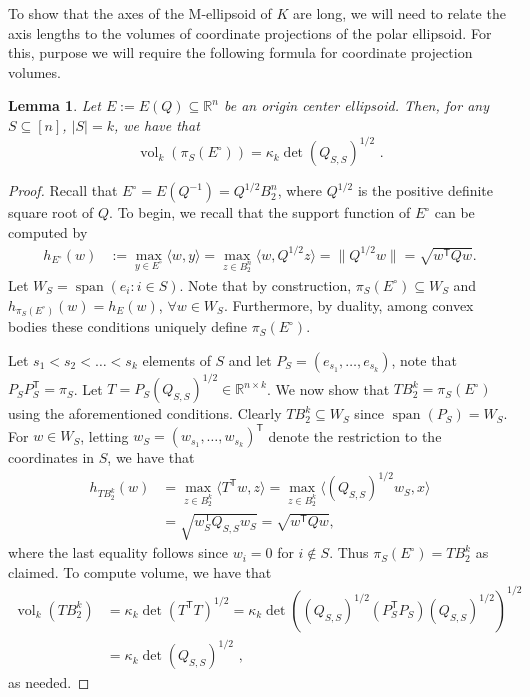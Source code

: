 \documentclass[12pt]{article}
\newtheorem{lemma}{Lemma}
\newcommand{\R}{{\mathbb{R}}}
\newcommand{\T}{\mathsf T}
\newcommand{\inner}[2]{\langle #1, #2 \rangle}
\DeclareMathOperator{\vol}{vol}
\DeclareMathOperator{\lspan}{span}
\begin{document}
To show that the axes of the M-ellipsoid of $K$ are long, we will need to relate
the axis lengths to the volumes of coordinate projections of the polar
ellipsoid. For this, purpose we will require the following formula for
coordinate projection volumes. 

\begin{lemma}\label{lem:ellipsoid-volumes}
Let $E := E(Q) \subseteq \R^n$ be an origin center ellipsoid. Then, for any
$S \subseteq [n]$, $|S| = k$, we have that 
\[
\vol_k(\pi_S(E^\circ)) = \kappa_k \det(Q_{S,S})^{1/2} \text{ .}
\]
\end{lemma}
\begin{proof}
Recall that $E^\circ = E(Q^{-1}) = Q^{1/2} B_2^n$, where $Q^{1/2}$ is the
positive definite square root of $Q$. To begin, we recall that the support
function of $E^\circ$ can be computed by
\begin{align*}
h_{E^\circ}(w) &:= \max_{y \in E^\circ} \inner{w}{y} 
               = \max_{z \in B_2^n} \inner{w}{Q^{1/2} z} 
               = \|Q^{1/2} w\| = \sqrt{w^\T Q w}.
\end{align*}
Let $W_S = \lspan(e_i: i \in S)$. Note that by construction, $\pi_S(E^\circ)
\subseteq W_S$ and $h_{\pi_S(E^\circ)}(w) = h_{E}(w)$, $\forall w \in W_S$.
Furthermore, by duality, among convex bodies these conditions uniquely define $\pi_S(E^\circ)$. 

Let $s_1 < s_2 < \dots < s_k$ elements of $S$ and let $P_S =
(e_{s_1},\dots,e_{s_k})$, note that $P_S P_S^\T = \pi_S$. Let $T = P_S
(Q_{S,S})^{1/2} \in \R^{n \times k}$. We now show that $TB_2^k = \pi_S(E^\circ)$
using the aforementioned conditions. Clearly $TB_2^k \subseteq W_S$ since
$\lspan(P_S) = W_S$. For $w \in W_S$, letting $w_S = (w_{s_1},\dots,w_{s_k})^\T$
denote the restriction to the coordinates in $S$, we have that 
\begin{align*}
h_{TB_2^k}(w) &= \max_{z \in B_2^k} \inner{T^\T w}{z} 
              = \max_{z \in B_2^k} \inner{(Q_{S,S})^{1/2} w_S}{x} \\ 
              &= \sqrt{w_S^\T Q_{S,S} w_S} = \sqrt{w^\T Q w} ,
\end{align*} 
where the last equality follows since $w_i = 0$ for $i \notin S$. Thus
$\pi_S(E^\circ) = TB_2^k$ as claimed. To compute volume, we have that
\begin{align*}
\vol_k(TB_2^k) &= \kappa_k \det(T^\T T)^{1/2} 
               = \kappa_k \det((Q_{S,S})^{1/2} (P_S^\T P_S)
(Q_{S,S})^{1/2})^{1/2} \\
               &= \kappa_k \det(Q_{S,S})^{1/2} \text{ ,}
\end{align*}
as needed.
\end{proof}
\end{document}
